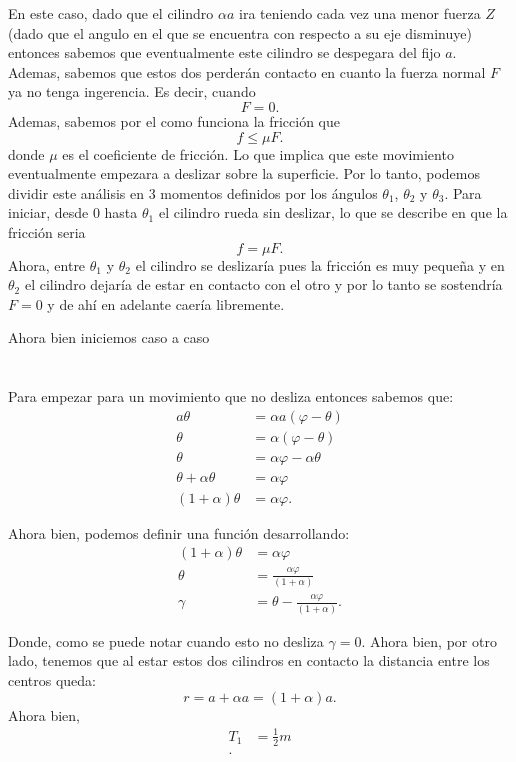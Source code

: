 \documentclass{report}
\begin{document}
En este caso, dado que el cilindro $\alpha a$ ira teniendo cada vez una menor fuerza $Z$ (dado que el angulo en el que se encuentra con respecto a su eje disminuye) entonces sabemos que eventualmente este cilindro se despegara del fijo $a$. Ademas, sabemos que estos dos perderán contacto en cuanto la fuerza normal  $F$ ya no tenga ingerencia. Es decir, cuando \[
F = 0
.\] Ademas, sabemos por el como funciona la fricción que \[
f \le \mu F
.\] donde $\mu$ es el coeficiente de fricción. Lo que implica que este movimiento eventualmente empezara a deslizar sobre la superficie. Por lo tanto, podemos dividir este análisis en 3 momentos definidos por los ángulos $\theta_1$, $\theta_2$ y $\theta_3$. Para iniciar, desde $0$ hasta $\theta_1$ el cilindro rueda sin deslizar, lo que se describe en que la fricción seria \[
f = \mu F
.\] Ahora, entre $\theta_1$ y $\theta_2$ el cilindro se deslizaría pues la fricción es muy pequeña y en $\theta_2$ el cilindro dejaría de estar en contacto con el otro y por lo tanto se sostendría $F = 0$ y de ahí en adelante caería libremente.

Ahora bien iniciemos caso a caso
\section{}

Para empezar para un movimiento que no desliza entonces sabemos que:
\begin{align*}
  a\theta &= \alpha a \left( \varphi - \theta \right) \\
  \theta &= \alpha \left( \varphi - \theta \right) \\
  \theta &= \alpha \varphi - \alpha \theta \\
  \theta + \alpha \theta &= \alpha\varphi \\
  \left( 1 + \alpha \right) \theta &= \alpha \varphi
.\end{align*}

Ahora bien, podemos definir una función desarrollando:
\begin{align*}
  \left( 1 + \alpha \right) \theta &= \alpha \varphi \\
  \theta &= \frac{\alpha \varphi}{\left( 1 + \alpha \right) } \\
  \gamma &= \theta - \frac{\alpha \varphi}{\left( 1 + \alpha \right) }
.\end{align*}

Donde, como se puede notar cuando esto no desliza $\gamma = 0$. Ahora bien, por otro lado, tenemos que al estar estos dos cilindros en contacto la distancia entre los centros queda: \[
r = a + \alpha a = \left( 1 + \alpha \right) a
.\] Ahora bien,
\begin{align*}
  T_1 &= \frac{1}{2}m \\
.\end{align*}
\end{document}
